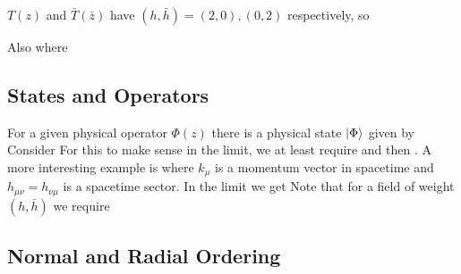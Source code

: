 \documentclass{article}
\begin{document}
\begin{example}
$T(z)$ and $\bar{T}(\bar{z})$ have $(h,\bar{h}) = (2,0), (0,2)$ respectively, so 
\end{example}

Also 
where 

\subsection{States and Operators}
For a given physical operator $\Phi(z)$ there is a physical state $\ket{\Phi}$ given by 
Consider 
For this to make sense in the limit, we at least require 
and then 
. 
A more interesting example is 
where $k_\mu$ is a momentum vector in spacetime and $h_{\mu\nu}=h_{\nu\mu}$ is a spacetime sector. In the limit we get 
Note that for a field of weight $(h,\bar{h})$ we require 

\subsection{Normal and Radial Ordering}
\end{document}
